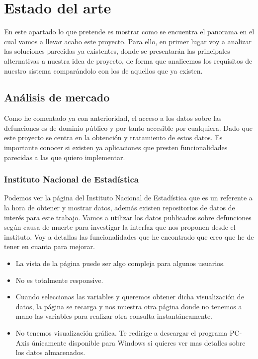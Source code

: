 \chapter{Estado del arte}

En este apartado lo que pretende es mostrar como se encuentra el panorama en el cual vamos a llevar
acabo este proyecto. Para ello, en primer lugar voy a analizar las soluciones parecidas ya existentes,
donde se presentarán las principales alternativas a nuestra idea de proyecto, de forma que analicemos
los requisitos de nuestro sistema comparándolo con los de aquellos que ya existen.

\section{Análisis de mercado}

Como he comentado ya con anterioridad, el acceso a los datos sobre las defunciones es de dominio público
y por tanto accesible por cualquiera. Dado que este proyecto se centra en la obtención y tratamiento de
estos datos. Es importante conocer si existen ya aplicaciones que presten funcionalidades parecidas a las que
quiero implementar.

\subsection{Instituto Nacional de Estadística}
Podemos ver la página del \cite{INE} Instituto Nacional de Estadística que es un referente a la hora de obtener
y mostrar datos, además existen repositorios de datos de interés para este trabajo.
Vamos a utilizar los datos publicados sobre defunciones según causa de muerte para investigar la interfaz que nos
proponen desde el instituto. Voy a detallas las funcionalidades que he encontrado que creo que he de tener
en cuanta para mejorar.
\begin{itemize}
    \item La vista de la página puede ser algo compleja para algunos usuarios.
    \item No es totalmente responsive.
    \item Cuando seleccionas las variables y queremos obtener dicha visualización de datos, la página se
    recarga y nos muestra otra página donde no tenemos a mano las variables para realizar
    otra consulta instantáneamente.
    \item No tenemos visualización gráfica. Te redirige a descargar el programa PC-Axis únicamente disponible para
    Windows si quieres ver mas detalles sobre los datos almacenados.
\end{itemize}

